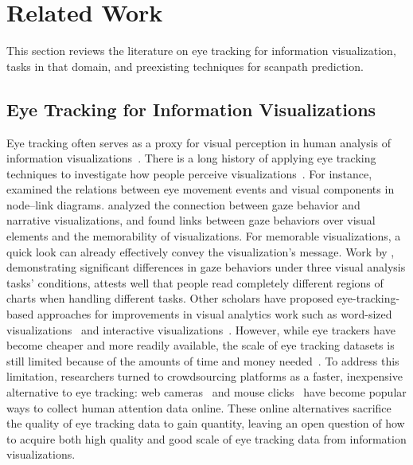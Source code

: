 \section{Related Work}
\label{sec:related}

This section reviews the literature on eye tracking for information visualization, tasks in that domain, and preexisting techniques for scanpath prediction.


\subsection{Eye Tracking for Information Visualizations}

Eye tracking often serves as a proxy for visual perception in human analysis of information visualizations~\cite{shin2022scanner}.
There is a long history of applying eye tracking techniques to investigate how people perceive visualizations~\cite{huang2007using, borkin2015beyond, polatsek2018exploring, lalle2020gaze}.
For instance, \citet{huang2007using} examined the relations between eye movement events and visual components in node--link diagrams.
\citet{lalle2020gaze} analyzed the connection between gaze behavior and narrative visualizations, and
\citet{borkin2015beyond} found links between gaze behaviors over visual elements and the memorability of visualizations. For memorable visualizations, a quick look can already effectively convey the visualization's message.
Work by \citet{polatsek2018exploring}, demonstrating significant differences in gaze behaviors under three visual analysis tasks' conditions, attests well that people read completely different regions of charts when handling different tasks.
Other scholars have proposed eye-tracking-based approaches for improvements in visual analytics work such as word-sized visualizations~\cite{beck2015word} and interactive visualizations~\cite{nguyen2015interactive}.
However, while eye trackers have become cheaper and more readily available, the scale of eye tracking datasets is still limited because of the amounts of time and money needed~\cite{shin2022scanner}.
To address this limitation, researchers turned to crowdsourcing platforms as a faster, inexpensive alternative to eye tracking:
web cameras~\cite{shin2022scanner} and mouse clicks~\cite{wang2024salchartqa} have become popular ways to collect human attention data online.
These online alternatives sacrifice the quality of eye tracking data to gain quantity, leaving an open question of how to acquire both high quality and good scale of eye tracking data from information visualizations.


